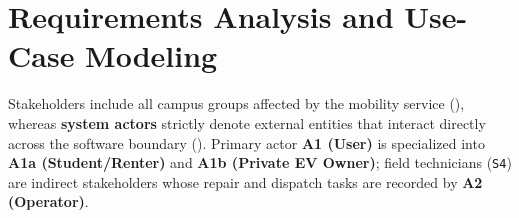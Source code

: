 \section{Requirements Analysis and Use-Case Modeling}
\label{sec:requirements}

\label{subsec:stakeholders-actors}
Stakeholders include all campus groups affected by the mobility service (), whereas \textbf{system actors} strictly denote external entities that interact directly across the software boundary (). Primary actor \textbf{A1 (User)} is specialized into \textbf{A1a (Student/Renter)} and \textbf{A1b (Private EV Owner)}; field technicians (\texttt{S4}) are indirect stakeholders whose repair and dispatch tasks are recorded by \textbf{A2 (Operator)}.

